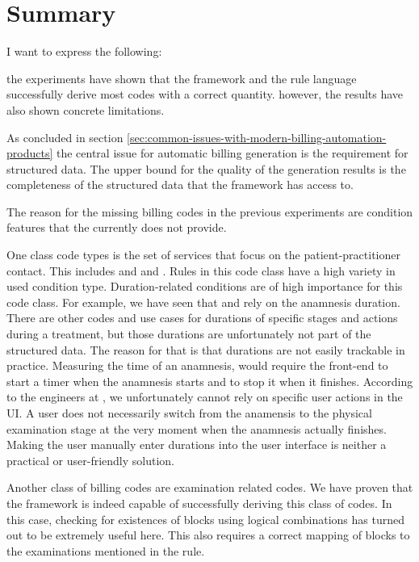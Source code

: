 \section{Summary}\label{sec:summary}

I want to express the following:

the experiments have shown that the framework and the rule language successfully derive most codes with a correct quantity.
however, the results have also shown concrete limitations.





As concluded in section \ref{sec:common-issues-with-modern-billing-automation-products} the central issue for automatic billing generation is the requirement for structured data.
The upper bound for the quality of the generation results is the completeness of the structured data that the framework has access to.

The reason for the missing billing codes in the previous experiments are condition features that the \RL currently does not provide.


One class code types is the set of services that focus on the patient-practitioner contact.
This includes  and  and .
Rules in this code class have a high variety in used condition type.
Duration-related conditions are of high importance for this code class.
For example, we have seen that  and  rely on the anamnesis duration.
There are other codes and use cases for durations of specific stages and actions during a treatment, but those durations are unfortunately not part of the structured data.
The reason for that is that durations are not easily trackable in practice.
Measuring the time of an anamnesis, would require the front-end to start a timer when the anamnesis starts and to stop it when it finishes.
According to the engineers at \AV, we unfortunately cannot rely on specific user actions in the UI.
A user does not necessarily switch from the anamensis to the physical examination stage at the very moment when the anamnesis actually finishes.
Making the user manually enter durations into the user interface is neither a practical or user-friendly solution.

Another class of billing codes are examination related codes.
We have proven that the framework is indeed capable of successfully deriving this class of codes.
In this case, checking for existences of blocks using logical combinations has turned out to be extremely useful here.
This also requires a correct mapping of blocks to the examinations mentioned in the rule.

